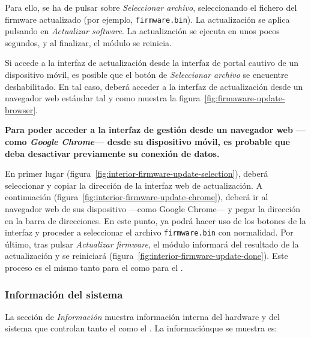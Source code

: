 Para ello, se ha de pulsar sobre \emph{Seleccionar archivo}, seleccionando el fichero del firmware actualizado (por ejemplo, \texttt{firmware.bin}). La actualización se aplica pulsando en \emph{Actualizar software}. La actualización se ejecuta en unos pocos segundos, y al finalizar, el módulo se reinicia.

Si accede a la interfaz de actualización desde la interfaz de portal cautivo de un dispositivo móvil, es posible que el botón de \emph{Seleccionar archivo} se encuentre deshabilitado. En tal caso, deberá acceder a la interfaz de actualización desde un navegador web estándar tal y como muestra la figura~\ref{fig:firmaware-update-browser}.


\textbf{Para poder acceder a la interfaz de gestión desde un navegador web ---como \textit{Google Chrome}--- desde su dispositivo móvil, es probable que deba desactivar previamente su conexión de datos.}


En primer lugar (figura~\ref{fig:interior-firmware-update-selection}), deberá seleccionar y copiar la dirección de la interfaz web de actualización. A continuación (figura~\ref{fig:interior-firmware-update-chrome}), deberá ir al navegador web de sus dispositivo ---como Google Chrome--- y pegar la dirección en la barra de direcciones. En este punto, ya podrá hacer uso de los botones de la interfaz y proceder a seleccionar el archivo \texttt{firmware.bin} con normalidad. Por último, tras pulsar \emph{Actualizar firmware}, el módulo informará del resultado de la actualización y se reiniciará (figura~\ref{fig:interior-firmware-update-done}). Este proceso es el mismo tanto para el \MIE como para el \MEE.
\attend

\subsubsection{Información del sistema}
\label{sec:info}

La sección de \emph{Información} muestra información interna del hardware y del sistema que controlan tanto el \MIE como el \MEE. La informaciónque se muestra es:



